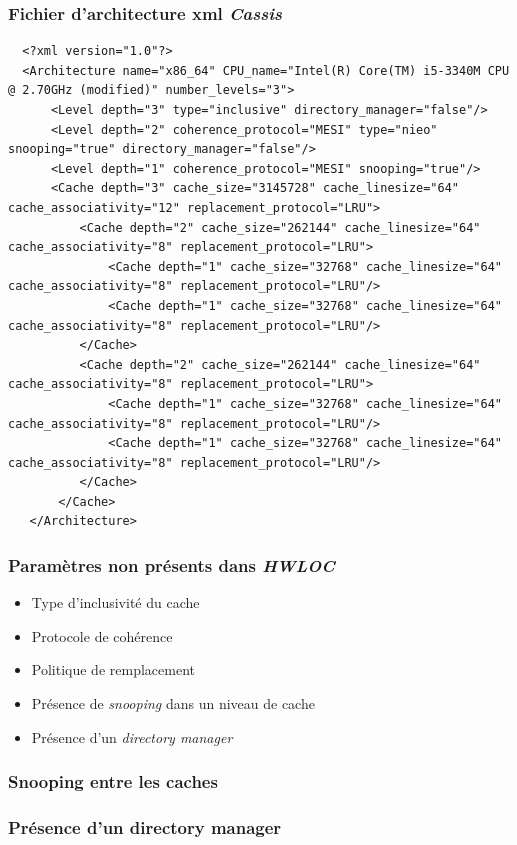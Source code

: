 \begin{frame}[fragile]
  \frametitle{Fichier d'architecture xml \emph{Cassis}}
  \begin{lstlisting}
  <?xml version="1.0"?>
  <Architecture name="x86_64" CPU_name="Intel(R) Core(TM) i5-3340M CPU @ 2.70GHz (modified)" number_levels="3">
      <Level depth="3" type="inclusive" directory_manager="false"/>
      <Level depth="2" coherence_protocol="MESI" type="nieo" snooping="true" directory_manager="false"/>
      <Level depth="1" coherence_protocol="MESI" snooping="true"/>
      <Cache depth="3" cache_size="3145728" cache_linesize="64" cache_associativity="12" replacement_protocol="LRU">
          <Cache depth="2" cache_size="262144" cache_linesize="64" cache_associativity="8" replacement_protocol="LRU">
              <Cache depth="1" cache_size="32768" cache_linesize="64" cache_associativity="8" replacement_protocol="LRU"/>
              <Cache depth="1" cache_size="32768" cache_linesize="64" cache_associativity="8" replacement_protocol="LRU"/>
          </Cache>
          <Cache depth="2" cache_size="262144" cache_linesize="64" cache_associativity="8" replacement_protocol="LRU">
              <Cache depth="1" cache_size="32768" cache_linesize="64" cache_associativity="8" replacement_protocol="LRU"/>
              <Cache depth="1" cache_size="32768" cache_linesize="64" cache_associativity="8" replacement_protocol="LRU"/>
          </Cache>
       </Cache>
   </Architecture>
  \end{lstlisting}
\end{frame}

\begin{frame}
  \frametitle{Paramètres non présents dans \emph{HWLOC}}
  \begin{itemize}
  \item<1-> Type d'inclusivité du cache 
  \item<1-> Protocole de cohérence 
  \item<1-> Politique de remplacement 
  \item<1-> Présence de \textit{snooping} dans un niveau de cache 
  \item<1-> Présence d'un \textit{directory manager} 
  \end{itemize}
\end{frame}

\begin{frame}
  \frametitle{Snooping entre les caches}
  
\end{frame}


\begin{frame}
  \frametitle{Présence d'un directory manager}
  
\end{frame}

